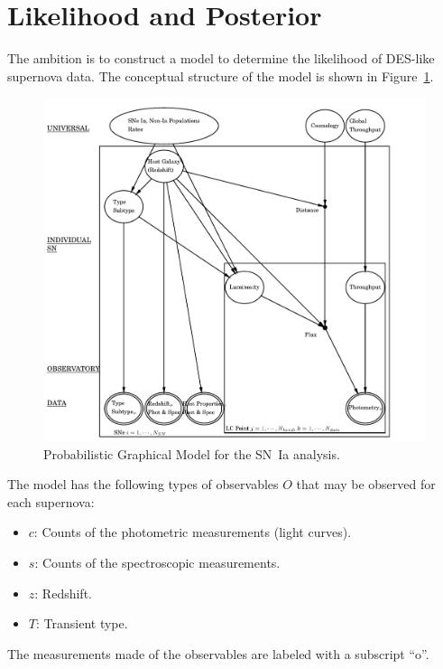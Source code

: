\documentclass[preprint,3p]{elsarticle}
\begin{document}
%
%

\section{Likelihood and Posterior}
\label{likelihood:sec}

The ambition is to construct a model to determine the likelihood of DES-like
supernova data. 
The conceptual structure of the model is shown in Figure~\ref{pgm:fig}. 
\begin{figure}[htbp] %
   \centering
   \includegraphics[width=6.5in]{../results//hdpgm.pdf} 
   \caption{Probabilistic Graphical Model for the SN~Ia analysis.  
   \label{pgm:fig}}
\end{figure}

The model has the following types of observables $O$ that
may be observed for each supernova:
\begin{itemize}
\item $c$: Counts of the photometric measurements (light curves).
\item $s$: Counts of the spectroscopic measurements.
\item $z$: Redshift.
\item $T$: Transient type.
\end{itemize}
The measurements made of the observables are labeled  with a subscript ``o''.
\end{document}
